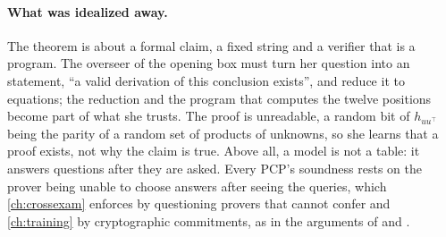 \begin{refsection}
\paragraph{What was idealized away.} The theorem is about a formal claim, a fixed string and a verifier that is a program. The overseer of the opening box must turn her question into an  statement, ``a valid derivation of this conclusion exists'', and reduce it to equations; the reduction and the program that computes the twelve positions become part of what she trusts. The proof is unreadable, a random bit of $h_{uu^\top}$ being the parity of a random set of products of unknowns, so she learns that a proof exists, not why the claim is true. Above all, a model is not a table: it answers questions after they are asked. Every PCP's soundness rests on the prover being unable to choose answers after seeing the queries, which \cref{ch:crossexam} enforces by questioning provers that cannot confer and \cref{ch:training} by cryptographic commitments, as in the arguments of \textcite{Kilian1992} and \textcite{Micali2000}.


\end{refsection}
